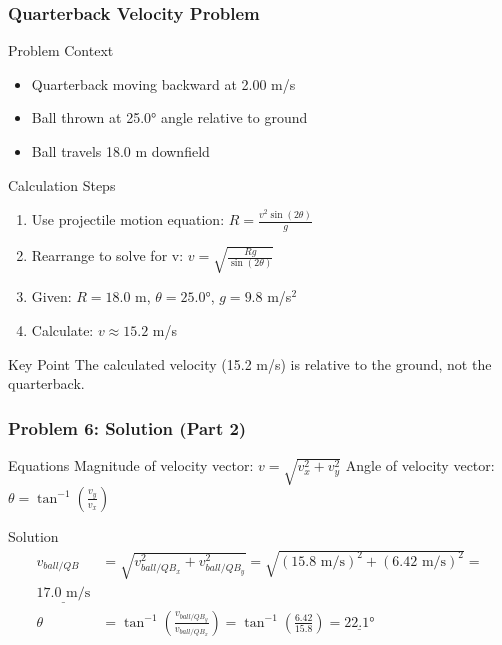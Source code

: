 \documentclass{beamer}
\begin{document}
\begin{frame}
\frametitle{Quarterback Velocity Problem}
\begin{block}{Problem Context}
\begin{itemize}
    \item Quarterback moving backward at 2.00 m/s
    \item Ball thrown at 25.0° angle relative to ground
    \item Ball travels 18.0 m downfield
\end{itemize}
\end{block}

\begin{block}{Calculation Steps}
\begin{enumerate}
    \item Use projectile motion equation: $R = \frac{v^2 \sin(2\theta)}{g}$
    \item Rearrange to solve for v: $v = \sqrt{\frac{R g}{\sin(2\theta)}}$
    \item Given: $R = 18.0$ m, $\theta = 25.0°$, $g = 9.8$ m/s$^2$
    \item Calculate: $v \approx 15.2$ m/s
\end{enumerate}
\end{block}

\begin{alertblock}{Key Point}
The calculated velocity (15.2 m/s) is relative to the ground, not the quarterback.
\end{alertblock}
\end{frame}



\begin{frame}
\frametitle{Problem 6: Solution (Part 2)}
\begin{block}{Equations}
Magnitude of velocity vector: $v = \sqrt{v_x^2 + v_y^2}$
Angle of velocity vector: $\theta = \tan^{-1}\left(\frac{v_y}{v_x}\right)$
\end{block}
\begin{block}{Solution}
\begin{align*}
v_{ball/QB} &= \sqrt{v_{ball/QB_x}^2 + v_{ball/QB_y}^2} = \sqrt{(15.8 \text{ m/s})^2 + (6.42 \text{ m/s})^2} = \\\underline{17.0 \text{ m/s}}\\
\theta &= \tan^{-1}\left(\frac{v_{ball/QB_y}}{v_{ball/QB_x}}\right) = \tan^{-1}\left(\frac{6.42}{15.8}\right) = \underline{22.1°}
\end{align*}
\end{block}
\end{frame}
\end{document}
